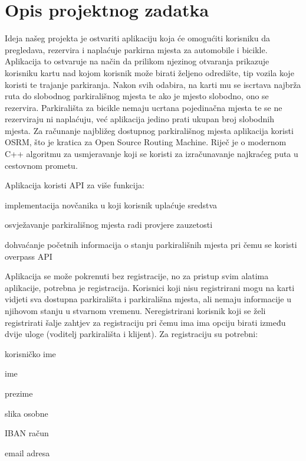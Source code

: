 \chapter{Opis projektnog zadatka}
		

		Ideja našeg projekta je ostvariti aplikaciju koja će omogućiti korisniku da pregledava, rezervira i naplaćuje parkirna mjesta za automobile i bicikle.
		Aplikacija to ostvaruje na način da prilikom njezinog otvaranja prikazuje korisniku kartu nad kojom korisnik može birati željeno odredište, tip vozila koje koristi te trajanje parkiranja. Nakon svih odabira, na karti mu se iscrtava najbrža ruta do slobodnog parkirališnog mjesta te ako je mjesto slobodno, ono se rezervira. Parkirališta za bicikle nemaju ucrtana pojedinačna mjesta te se ne rezerviraju ni naplaćuju, već aplikacija jedino prati ukupan broj slobodnih mjesta.
		Za računanje najbližeg dostupnog parkirališnog mjesta aplikacija koristi OSRM, što je kratica za Open Source Routing Machine. Riječ je o modernom C++ algoritmu za usmjeravanje koji se koristi za izračunavanje najkraćeg puta u cestovnom prometu. 
		
	    \noindent Aplikacija koristi API za više funkcija:
		\begin{packed_item}
			\item implementacija novčanika u koji korisnik uplaćuje sredstva
			\item osvježavanje parkirališnog mjesta radi provjere zauzetosti
			\item dohvaćanje početnih informacija o stanju parkirališnih mjesta pri čemu se koristi overpass API
		\end{packed_item}
		 
		Aplikacija se može pokrenuti bez registracije, no za pristup svim alatima aplikacije, potrebna je registracija. Korisnici koji nisu registrirani mogu na karti vidjeti sva dostupna parkirališta i parkirališna mjesta, ali nemaju informacije u njihovom stanju u stvarnom vremenu. Neregistrirani korisnik koji se želi registrirati šalje zahtjev za registraciju pri čemu ima ima opciju birati između dvije uloge (voditelj parkirališta i klijent). Za registraciju su potrebni:
		\begin{packed_item}
			\item korisničko ime
			\item ime
			\item prezime
			\item slika osobne
			\item IBAN račun
			\item email adresa
		\end{packed_item}
		
